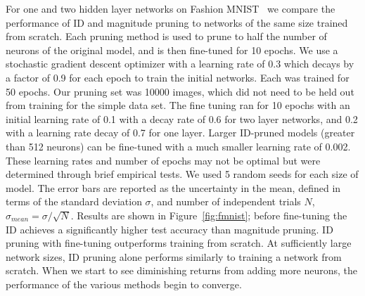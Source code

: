 For one and two hidden layer networks on Fashion MNIST~\cite{datafashionmnist} we compare the performance of ID and magnitude pruning to networks of the same size trained from scratch.
Each pruning method is used to prune to half the number of neurons of the original model, and is then fine-tuned for 10 epochs.
We use a stochastic gradient descent optimizer with a learning rate of 0.3 which decays by a factor of 0.9 for each epoch to train the initial networks.  Each was trained for 50 epochs.  Our pruning set was 10000 images, which did not need to be held out from training for the simple data set. The fine tuning ran for 10 epochs with an initial learning rate of 0.1 with a decay rate of 0.6 for two layer networks, and 0.2 with a learning rate decay of 0.7 for one layer.  Larger ID-pruned models (greater than 512 neurons) can be fine-tuned with a much smaller learning rate of 0.002. These learning rates and number of epochs may not be optimal but were determined through brief empirical tests. We used 5 random seeds for each size of model.  The error bars are reported as the uncertainty in the mean, defined in terms of the standard deviation $\sigma$, and number of independent trials $N$,  $\sigma_{mean}=\sigma/\sqrt{N}$.
Results are shown in Figure~\ref{fig:fmnist}; before fine-tuning the ID achieves a significantly higher test accuracy than magnitude pruning.
ID pruning with fine-tuning outperforms training from scratch. %
At sufficiently large network sizes, ID pruning alone performs similarly to training a network from scratch. 
When we start to see diminishing returns from adding more neurons, the performance of the various methods begin to converge.  



